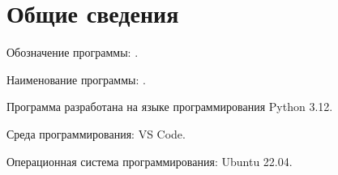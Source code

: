 \newpage
\section{Общие сведения}
Обозначение программы: \productcodefull.

Наименование программы: \programname.

Программа разработана на языке программирования Python 3.12.

Среда программирования: VS Code.

Операционная система программирования: Ubuntu 22.04.